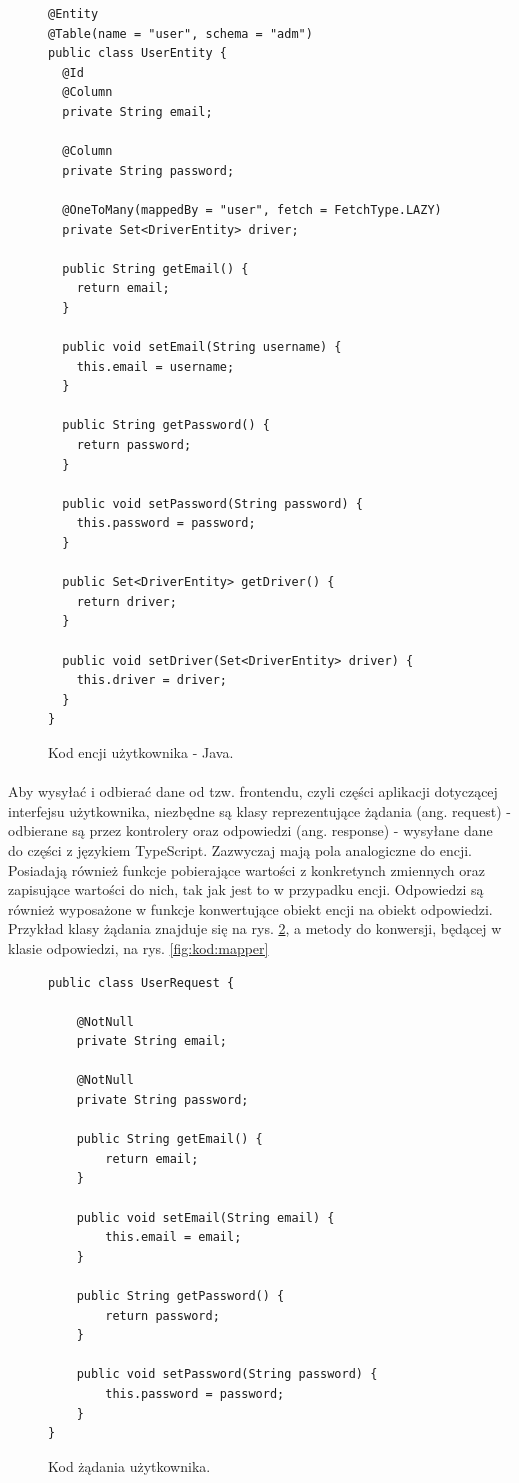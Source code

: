\begin{figure}
\centering
\begin{lstlisting}
@Entity
@Table(name = "user", schema = "adm")
public class UserEntity {
  @Id
  @Column
  private String email;

  @Column
  private String password;

  @OneToMany(mappedBy = "user", fetch = FetchType.LAZY)
  private Set<DriverEntity> driver;

  public String getEmail() {
    return email;
  }

  public void setEmail(String username) {
    this.email = username;
  }

  public String getPassword() {
    return password;
  }

  public void setPassword(String password) {
    this.password = password;
  }

  public Set<DriverEntity> getDriver() {
    return driver;
  }

  public void setDriver(Set<DriverEntity> driver) {
    this.driver = driver;
  }
}
\end{lstlisting}
\caption{Kod encji użytkownika - Java.}
\label{fig:kod:encja}
\end{figure}

\paragraph{}
Aby wysyłać i odbierać dane od tzw. frontendu, czyli części aplikacji dotyczącej interfejsu użytkownika, niezbędne są klasy reprezentujące żądania (ang. request) - odbierane są przez kontrolery oraz odpowiedzi (ang. response) - wysyłane dane do części z językiem TypeScript. Zazwyczaj mają pola analogiczne do encji. Posiadają również funkcje pobierające wartości z konkretynch zmiennych oraz zapisujące wartości do nich, tak jak jest to w przypadku encji. Odpowiedzi są również wyposażone w funkcje konwertujące obiekt encji na obiekt odpowiedzi. Przykład klasy żądania znajduje się na rys. \ref{fig:kod:request}, a metody do konwersji, będącej w klasie odpowiedzi, na rys. \ref{fig:kod:mapper}

\begin{figure}
\centering
\begin{lstlisting}
public class UserRequest {

    @NotNull
    private String email;
    
    @NotNull
    private String password;

    public String getEmail() {
        return email;
    }

    public void setEmail(String email) {
        this.email = email;
    }

    public String getPassword() {
        return password;
    }

    public void setPassword(String password) {
        this.password = password;
    }
}
\end{lstlisting}
\caption{Kod żądania użytkownika.}
\label{fig:kod:request}
\end{figure}

